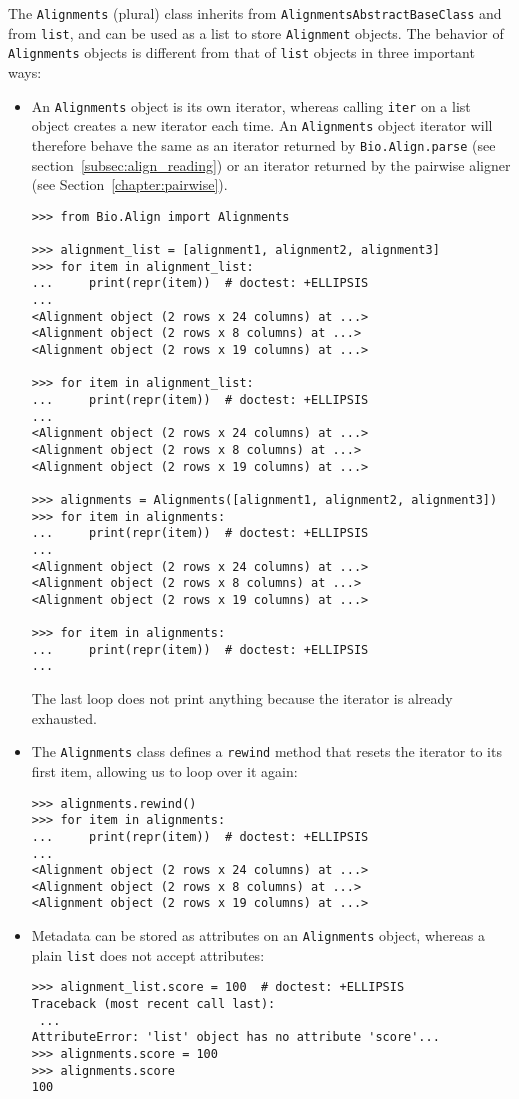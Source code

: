 The \verb|Alignments| (plural) class inherits from \verb|AlignmentsAbstractBaseClass| and from \verb|list|, and can be used as a list to store \verb|Alignment| objects. The behavior of \verb|Alignments| objects is different from that of \verb|list| objects in three important ways:
\begin{itemize}
\item An \verb|Alignments| object is its own iterator, whereas calling \verb|iter| on a list object creates a new iterator each time. An \verb|Alignments| object iterator will therefore behave the same as an iterator returned by \verb|Bio.Align.parse| (see section~\ref{subsec:align_reading}) or an iterator returned by the pairwise aligner (see Section~\ref{chapter:pairwise}).
\begin{verbatim}
>>> from Bio.Align import Alignments

>>> alignment_list = [alignment1, alignment2, alignment3]
>>> for item in alignment_list:
...     print(repr(item))  # doctest: +ELLIPSIS
...
<Alignment object (2 rows x 24 columns) at ...>
<Alignment object (2 rows x 8 columns) at ...>
<Alignment object (2 rows x 19 columns) at ...>

>>> for item in alignment_list:
...     print(repr(item))  # doctest: +ELLIPSIS
...
<Alignment object (2 rows x 24 columns) at ...>
<Alignment object (2 rows x 8 columns) at ...>
<Alignment object (2 rows x 19 columns) at ...>

>>> alignments = Alignments([alignment1, alignment2, alignment3])
>>> for item in alignments:
...     print(repr(item))  # doctest: +ELLIPSIS
...
<Alignment object (2 rows x 24 columns) at ...>
<Alignment object (2 rows x 8 columns) at ...>
<Alignment object (2 rows x 19 columns) at ...>

>>> for item in alignments:
...     print(repr(item))  # doctest: +ELLIPSIS
...
\end{verbatim}
The last loop does not print anything because the iterator is already exhausted.
\item The \verb|Alignments| class defines a \verb|rewind| method that resets the iterator to its first item, allowing us to loop over it again:
\begin{verbatim}
>>> alignments.rewind()
>>> for item in alignments:
...     print(repr(item))  # doctest: +ELLIPSIS
...
<Alignment object (2 rows x 24 columns) at ...>
<Alignment object (2 rows x 8 columns) at ...>
<Alignment object (2 rows x 19 columns) at ...>
\end{verbatim}
\item Metadata can be stored as attributes on an \verb|Alignments| object, whereas a plain \verb|list| does not accept attributes:
\begin{verbatim}
>>> alignment_list.score = 100  # doctest: +ELLIPSIS
Traceback (most recent call last):
 ...
AttributeError: 'list' object has no attribute 'score'...
>>> alignments.score = 100
>>> alignments.score
100
\end{verbatim}
\end{itemize}


